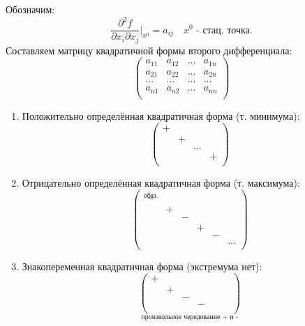 \documentclass[12pt]{article}
\begin{document}
    \begin{adjustwidth}{1.5em}{1.5em}
        Обозначим: 
        \[ \frac{\partial^2 f}{\partial x_i \partial x_j} \Big|_{x^0} = a_{ij} \quad x^0 \text{ - стац. точка.} \]
        Составляем матрицу квадратичной формы второго дифференциала:
        \[
            \begin{pmatrix}
                a_{11} & a_{12} & \dots & a_{1n} \\
                a_{21} & a_{22} & \dots & a_{2n} \\
                \dots & \dots & \dots & \dots \\
                a_{n1} & a_{n2} & \dots & a_{nn} \\
            \end{pmatrix} 
        \]
        \begin{enumerate}
            \item Положительно определённая квадратичная форма (т. минимума): \[ \begin{pmatrix}
                + & & & \\
                & + & & \\
                & & \dots & \\
                & & & + \\
            \end{pmatrix} \]
            \item Отрицательно определённая квадратичная форма (т. максимума): \[ \begin{pmatrix}
                \overset{\text{обяз.}}{-} & & & & & \\
                & + & & & & \\
                & & - & & & \\
                & & & + & & \\
                & & & & - & \\
                & & & & & \dots \\
            \end{pmatrix} \]
            \item Знакопеременная квадратичная форма (экстремума нет): \[ \underset{\text{произвольное чередование + и -}}{\begin{pmatrix}
                + & & & & & & \\
                & + & & & & & \\
                & & - & & & & \\
                & & & - & & & \\

\end{pmatrix}}\]
\end{enumerate}
\end{adjustwidth}
\end{document}

